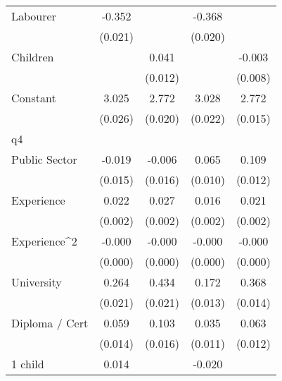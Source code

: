 {\begin{tabular}{l*{4}{c}}
Labourer            &      -0.352\sym{***}&                     &      -0.368\sym{***}&                     \\
                    &     (0.021)         &                     &     (0.020)         &                     \\
Children            &                     &       0.041\sym{***}&                     &      -0.003         \\
                    &                     &     (0.012)         &                     &     (0.008)         \\
Constant            &       3.025\sym{***}&       2.772\sym{***}&       3.028\sym{***}&       2.772\sym{***}\\
                    &     (0.026)         &     (0.020)         &     (0.022)         &     (0.015)         \\
\hline
q4                  &                     &                     &                     &                     \\
Public Sector       &      -0.019         &      -0.006         &       0.065\sym{***}&       0.109\sym{***}\\
                    &     (0.015)         &     (0.016)         &     (0.010)         &     (0.012)         \\
Experience          &       0.022\sym{***}&       0.027\sym{***}&       0.016\sym{***}&       0.021\sym{***}\\
                    &     (0.002)         &     (0.002)         &     (0.002)         &     (0.002)         \\
Experience^{2}      &      -0.000\sym{***}&      -0.000\sym{***}&      -0.000\sym{***}&      -0.000\sym{***}\\
                    &     (0.000)         &     (0.000)         &     (0.000)         &     (0.000)         \\
University          &       0.264\sym{***}&       0.434\sym{***}&       0.172\sym{***}&       0.368\sym{***}\\
                    &     (0.021)         &     (0.021)         &     (0.013)         &     (0.014)         \\
Diploma / Cert      &       0.059\sym{***}&       0.103\sym{***}&       0.035\sym{***}&       0.063\sym{***}\\
                    &     (0.014)         &     (0.016)         &     (0.011)         &     (0.012)         \\
1 child             &       0.014         &                     &      -0.020\sym{**} &                     \\

\end{tabular}}
